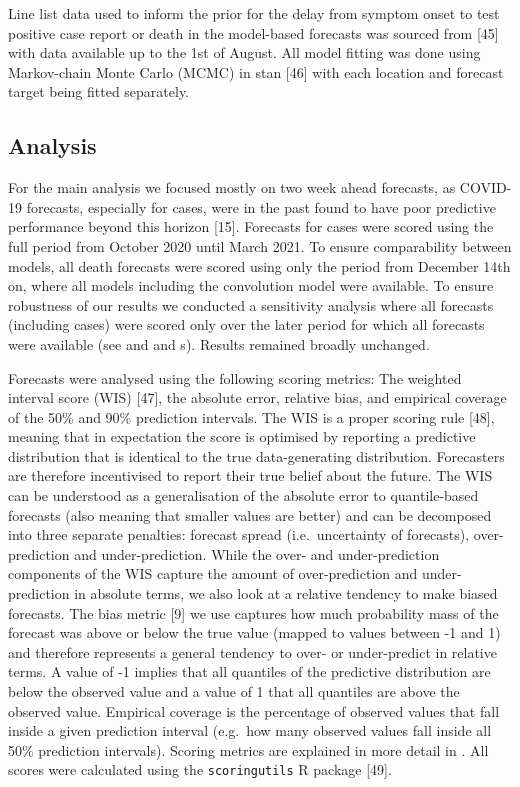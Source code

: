 \documentclass[10pt,letterpaper]{article}
\begin{document}
Line list data used to inform the prior for the delay from symptom onset
to test positive case report or death in the model-based forecasts was
sourced from {[}45{]} with data available up to the 1st of August. All
model fitting was done using Markov-chain Monte Carlo (MCMC) in stan
{[}46{]} with each location and forecast target being fitted separately.

\hypertarget{analysis}{%
\subsection{Analysis}\label{analysis}}

For the main analysis we focused mostly on two week ahead forecasts, as
COVID-19 forecasts, especially for cases, were in the past found to have
poor predictive performance beyond this horizon {[}15{]}. Forecasts for
cases were scored using the full period from October 2020 until March
2021. To ensure comparability between models, all death forecasts were
scored using only the period from December 14th on, where all models
including the convolution model were available. To ensure robustness of
our results we conducted a sensitivity analysis where all forecasts
(including cases) were scored only over the later period for which all
forecasts were available (see  and
 and s).
Results remained broadly unchanged.

Forecasts were analysed using the following scoring metrics: The
weighted interval score (WIS) {[}47{]}, the absolute error, relative
bias, and empirical coverage of the 50\% and 90\% prediction intervals.
The WIS is a proper scoring rule {[}48{]}, meaning that in expectation
the score is optimised by reporting a predictive distribution that is
identical to the true data-generating distribution. Forecasters are
therefore incentivised to report their true belief about the future. The
WIS can be understood as a generalisation of the absolute error to
quantile-based forecasts (also meaning that smaller values are better)
and can be decomposed into three separate penalties: forecast spread
(i.e.~uncertainty of forecasts), over-prediction and under-prediction.
While the over- and under-prediction components of the WIS capture the
amount of over-prediction and under-prediction in absolute terms, we
also look at a relative tendency to make biased forecasts. The bias
metric {[}9{]} we use captures how much probability mass of the forecast
was above or below the true value (mapped to values between -1 and 1)
and therefore represents a general tendency to over- or under-predict in
relative terms. A value of -1 implies that all quantiles of the
predictive distribution are below the observed value and a value of 1
that all quantiles are above the observed value. Empirical coverage is
the percentage of observed values that fall inside a given prediction
interval (e.g.~how many observed values fall inside all 50\% prediction
intervals). Scoring metrics are explained in more detail in
. All scores were calculated using the
\texttt{scoringutils} R package {[}49{]}.
\end{document}
